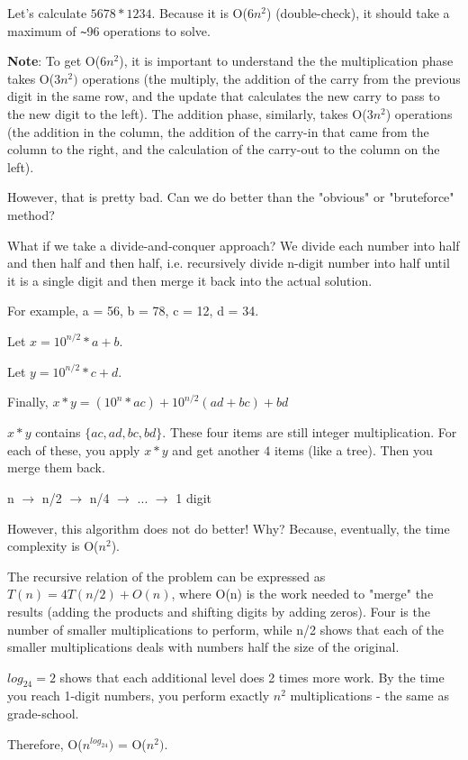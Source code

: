 \documentclass[11pt]{article}
\newenvironment{aside}
  {\begin{mdframed}[style=0,%
      leftline=false,rightline=false,leftmargin=2em,rightmargin=2em,%
          innerleftmargin=0pt,innerrightmargin=0pt,linewidth=0.75pt,%
      skipabove=7pt,skipbelow=7pt]\small}
  {\end{mdframed}}
\begin{document}
Let's calculate $5678 * 1234$. Because it is O(\(6n^2\)) (double-check), it should take a maximum of \texttt{\~}96 operations to solve.

\vspace{11pt}
\begin{aside}
    \textbf{Note}: To get O(\(6n^2\)), it is important to understand the the multiplication phase takes O(\(3n^2)\) operations (the multiply, the addition of the carry from the previous digit in the same row, and the update that calculates the new carry to pass to the new digit to the left). The addition phase, similarly, takes O(\(3n^2\)) operations (the addition in the column, the addition of the carry-in that came from the column to the right, and the calculation of the carry-out to the column on the left).
\end{aside}
\vspace{11pt}

However, that is pretty bad. Can we do better than the "obvious" or "bruteforce" method?

What if we take a divide-and-conquer approach? We divide each number into half and then half and then half, i.e. recursively divide n-digit number into half until it is a single digit and then merge it back into the actual solution.

For example, a = 56, b = 78, c = 12, d = 34. 

Let $x = {10^{n/2}} * a + b$. 

Let $y = {10^{n/2}} * c + d$. 

Finally, $x * y = ({10^n} * ac) + {10^{n/2}}(ad+bc) + bd$

$x*y$ contains $\{ac, ad, bc, bd\}$. These four items are still integer multiplication. For each of these, you apply $x * y$ and get another $4$ items (like a tree). Then you merge them back.

n $\to$ {n/2} $\to$ {n/4} $\to$ ... $\to$ {1 digit}

However, this algorithm does not do better! Why? Because, eventually, the time complexity is O(\(n^2\)).
\vspace{11pt}
\begin{aside}
    The recursive relation of the problem can be expressed as $T(n) = 4T({n/2}) + O(n)$, where O(n) is the work needed to "merge" the results (adding the products and shifting digits by adding zeros). Four is the number of smaller multiplications to perform, while {n/2} shows that each of the smaller multiplications deals with numbers half the size of the original.

    \(log_24 = 2\) shows that each additional level does 2 times more work. By the time you reach 1-digit numbers, you perform exactly \(n^2\) multiplications - the same as grade-school.

    Therefore, O(\(n^{log_24})\) = O(\(n^2)\).
\end{aside}
\vspace{11pt}
\end{document}
